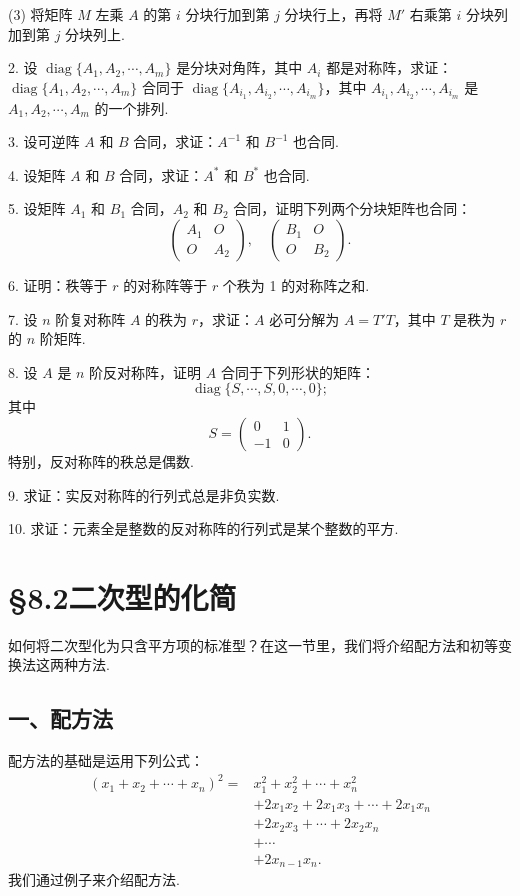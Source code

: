 \documentclass[UTF8,12pt,a4paper,fontset=fandol]{ctexart}
\begin{document}
(3) 将矩阵 $M$ 左乘 $A$ 的第 $i$ 分块行加到第 $j$ 分块行上，再将 $M'$ 右乘第 $i$ 分块列加到第 $j$ 分块列上.

2. 设 $\operatorname{diag}\{A_1,A_2,\cdots,A_m\}$ 是分块对角阵，其中 $A_i$ 都是对称阵，求证：$\operatorname{diag}\{A_1,A_2,\cdots,A_m\}$ 合同于 $\operatorname{diag}\{A_{i_1},A_{i_2},\cdots,A_{i_m}\}$，其中 $A_{i_1},A_{i_2},\cdots,A_{i_m}$ 是 $A_1,A_2,\cdots,A_m$ 的一个排列.

3. 设可逆阵 $A$ 和 $B$ 合同，求证：$A^{-1}$ 和 $B^{-1}$ 也合同.

4. 设矩阵 $A$ 和 $B$ 合同，求证：$A^*$ 和 $B^*$ 也合同.

5. 设矩阵 $A_1$ 和 $B_1$ 合同，$A_2$ 和 $B_2$ 合同，证明下列两个分块矩阵也合同：
\[
\left(\begin{array}{cc}
A_1&O\\
O&A_2
\end{array}\right),\quad
\left(\begin{array}{cc}
B_1&O\\
O&B_2
\end{array}\right).
\]

6. 证明：秩等于 $r$ 的对称阵等于 $r$ 个秩为 1 的对称阵之和.

7. 设 $n$ 阶复对称阵 $A$ 的秩为 $r$，求证：$A$ 必可分解为 $A=T'T$，其中 $T$ 是秩为 $r$ 的 $n$ 阶矩阵.

8. 设 $A$ 是 $n$ 阶反对称阵，证明 $A$ 合同于下列形状的矩阵：
\[
\operatorname{diag}\{S,\cdots,S,0,\cdots,0\};
\]
其中
\[
S=\left(\begin{array}{cc}
0&1\\
-1&0
\end{array}\right).
\]
特别，反对称阵的秩总是偶数.

9. 求证：实反对称阵的行列式总是非负实数.

10. 求证：元素全是整数的反对称阵的行列式是某个整数的平方.

\section*{§8.2\quad 二次型的化简}

如何将二次型化为只含平方项的标准型？在这一节里，我们将介绍配方法和初等变换法这两种方法.

\subsection*{一、配方法}

配方法的基础是运用下列公式：
\[
\begin{aligned}
(x_1+x_2+\cdots+x_n)^2
={}&x_1^2+x_2^2+\cdots+x_n^2\\
&+2x_1x_2+2x_1x_3+\cdots+2x_1x_n\\
&+2x_2x_3+\cdots+2x_2x_n\\
&+\cdots\\
&+2x_{n-1}x_n.
\end{aligned}
\]
我们通过例子来介绍配方法.
\end{document}
